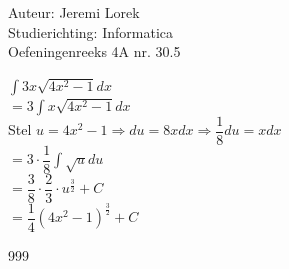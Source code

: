 \documentclass[a4paper]{article}
\begin{document}
\noindent \large Auteur: Jeremi Lorek\\
\noindent \large Studierichting: Informatica\\
\noindent \large Oefeningenreeks 4A nr. 30.5\\

\medskip
\normalsize

$\displaystyle \int 3x \sqrt{4x^2 - 1} dx$ \\

$= 3 \displaystyle \int x \sqrt{4x^2 - 1} dx$ \\

Stel $u = 4x^2 - 1 \Rightarrow du = 8x dx \Rightarrow \dfrac{1}{8} du = x dx $\\

$= 3 \cdot \dfrac{1}{8} \displaystyle \int \sqrt{u} du$ \\

$= \dfrac{3}{8} \cdot \dfrac{2}{3} \cdot u^{\tfrac{3}{2}} + C$ \\

$= \dfrac{1}{4} (4x^2 - 1)^{\tfrac{3}{2}} + C$ \\

\begin{thebibliography}{999}
\end{thebibliography}
\end{document}
